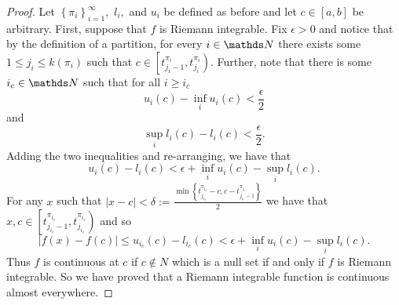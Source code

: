 \begin{proof}
Let $\left\{ \pi_{i}\right\} _{i=1}^{\infty},$ $l_{i},$ and $u_{i}$
be defined as before and let $c\in\left[a,b\right]$ be arbitrary.
First, suppose that $f$ is Riemann integrable. Fix $\epsilon>0$
and notice that by the definition of a partition, for every $i\in\N$
there exists some $1\leq j_{i}\leq k\left(\pi_{i}\right)$ such that
$c\in\left[t_{j_{i}-1}^{\pi_{i}},t_{j_{i}}^{\pi_{i}}\right)$. Further,
note that there is some $i_{c}\in\N$ such that for all $i\geq i_{c}$
\[
u_{i}\left(c\right)-\inf_{i}u_{i}\left(c\right)<\frac{\epsilon}{2}
\]
and
\[
\sup_{i}l_{i}\left(c\right)-l_{i}\left(c\right)<\frac{\epsilon}{2}.
\]
Adding the two inequalities and re-arranging, we have that 
\[
u_{i}\left(c\right)-l_{i}\left(c\right)<\epsilon+\inf_{i}u_{i}\left(c\right)-\sup_{i}l_{i}\left(c\right).
\]
For any $x$ such that $\lvert x-c\rvert<\delta:=\frac{\min\left\{ t_{j_{i_{c}}}^{\pi_{i_{c}}}-c,c-t_{j_{i_{c}}-1}^{\pi_{i_{c}}}\right\} }{2}$
we have that $x,c\in\left[t_{j_{i_{c}}-1}^{\pi_{i_{c}}},t_{j_{i_{c}}}^{\pi_{i_{c}}}\right)$
and so
\[
\lvert f\left(x\right)-f\left(c\right)\rvert\leq u_{i_{c}}\left(c\right)-l_{i_{c}}\left(c\right)<\epsilon+\inf_{i}u_{i}\left(c\right)-\sup_{i}l_{i}\left(c\right).
\]
Thus $f$ is continuous at $c$ if $c\notin N$ which is a null set
if and only if $f$ is Riemann integrable. So we have proved that
a Riemann integrable function is continuous almost everywhere.


\end{proof}
